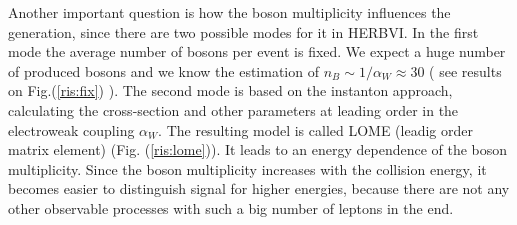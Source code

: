 \documentclass[a4paper,12pt]{article}         %
\begin{document}
Another important question is how the boson multiplicity influences the generation, since there are two possible modes for it in HERBVI. In the first mode the average number of bosons per event is fixed. We expect a huge number of produced bosons and we know the estimation of $n_B \sim 1/\alpha_W \approx 30$ ( see results on Fig.(\ref{ris:fix}) ). The second mode is based on the instanton approach, calculating the cross-section and other parameters at leading order in the electroweak coupling $\alpha_W$. The resulting model is called LOME (leadig order matrix element) (Fig. (\ref{ris:lome})). It leads to an energy dependence of  the boson multiplicity. Since the boson multiplicity increases with the collision energy, it becomes easier to distinguish signal for higher energies, because there are not any other observable processes with such a big number of leptons in the end.
\end{document}

